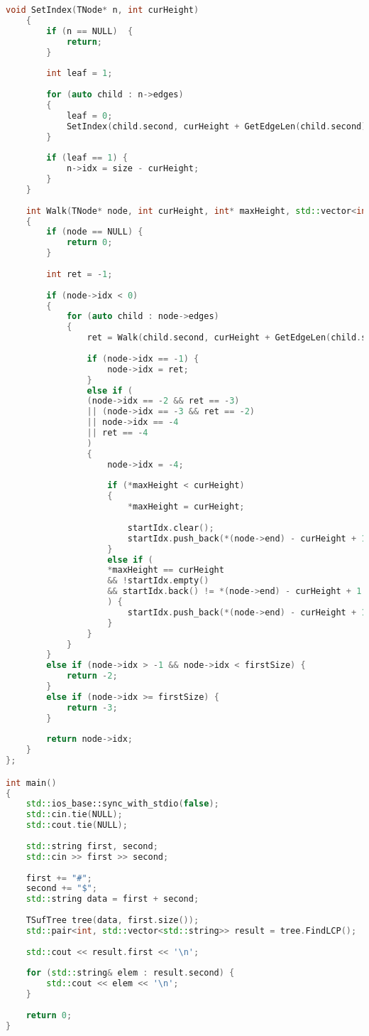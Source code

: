 \begin{lstlisting}[language=C++]
	void SetIndex(TNode* n, int curHeight) 
	{
		if (n == NULL)  {
			return;
		}
		
		int leaf = 1;
		
		for (auto child : n->edges) 
		{
			leaf = 0;
			SetIndex(child.second, curHeight + GetEdgeLen(child.second));
		}
		
		if (leaf == 1) {
			n->idx = size - curHeight;
		}
	}
	
	int Walk(TNode* node, int curHeight, int* maxHeight, std::vector<int>& startIdx) 
	{
		if (node == NULL) {
			return 0;
		}
		
		int ret = -1;
		
		if (node->idx < 0) 
		{ 
			for (auto child : node->edges) 
			{
				ret = Walk(child.second, curHeight + GetEdgeLen(child.second), maxHeight, startIdx);
				
				if (node->idx == -1) {
					node->idx = ret;
				}
				else if (
				(node->idx == -2 && ret == -3) 
				|| (node->idx == -3 && ret == -2) 
				|| node->idx == -4 
				|| ret == -4
				) 
				{
					node->idx = -4;
					
					if (*maxHeight < curHeight) 
					{
						*maxHeight = curHeight;
						
						startIdx.clear();
						startIdx.push_back(*(node->end) - curHeight + 1);
					}
					else if (
					*maxHeight == curHeight 
					&& !startIdx.empty() 
					&& startIdx.back() != *(node->end) - curHeight + 1
					) {
						startIdx.push_back(*(node->end) - curHeight + 1);
					}
				}
			}
		}
		else if (node->idx > -1 && node->idx < firstSize) { 
			return -2;
		}
		else if (node->idx >= firstSize) { 
			return -3;
		}
		
		return node->idx;
	}
};

int main() 
{
	std::ios_base::sync_with_stdio(false);
	std::cin.tie(NULL);
	std::cout.tie(NULL);
	
	std::string first, second;
	std::cin >> first >> second;
	
	first += "#";
	second += "$";
	std::string data = first + second;
	
	TSufTree tree(data, first.size());
	std::pair<int, std::vector<std::string>> result = tree.FindLCP();
	
	std::cout << result.first << '\n';
	
	for (std::string& elem : result.second) {
		std::cout << elem << '\n';
	}
	
	return 0;
}


\end{lstlisting}

\pagebreak

